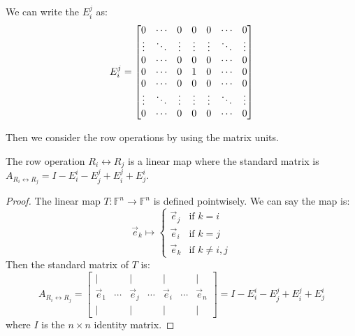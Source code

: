 \documentclass[
	11pt, %
	fleqn, %
	a4paper, %
]{LegrandOrangeBook}
\newcommand{\F}{\mathbb{F}} %
\newcommand{\mypoint}[2]{\tikz[remember picture]{\node[inner sep=0, anchor=base](#1){$#2$};}}
\begin{document}
We can write the $E_i^j$ as:
\vspace{7ex}
\[
    E_i^j = \begin{bmatrix}
        0 & \cdots & 0 & \mypoint{herei}{0} & 0 & \cdots & 0 \\
        \vdots & \ddots & \vdots & \vdots & \vdots & \ddots & \vdots \\
        0 & \cdots & 0 & 0 & 0 & \cdots & 0 \\
        0 & \cdots & 0 & 1 & 0 & \cdots & \mypoint{herej}{0} \\
        0 & \cdots & 0 & 0 & 0 & \cdots & 0 \\
        \vdots & \ddots & \vdots & \vdots & \vdots & \ddots & \vdots \\
        0 & \cdots & 0 & 0 & 0 & \cdots & 0 \\
    \end{bmatrix}
\]

Then we consider the row operations by using the matrix units.

\begin{proposition}
    The row operation $R_i \leftrightarrow R_j$ is a linear map where the standard matrix is $A_{R_i \leftrightarrow R_j} = I - E_i^i - E_j^j + E_i^j + E_j^i$.
\end{proposition}

\begin{proof}
    The linear map $T: \F^n \to \F^n$ is defined pointwisely. We can say the map is:
    \[
        \vec{e}_k \mapsto \begin{cases}
            \vec{e}_j & \text{if } k = i \\
            \vec{e}_i & \text{if } k = j \\
            \vec{e}_k & \text{if } k \neq i, j
        \end{cases}
    \]
    Then the standard matrix of $T$ is:
    \[
        A_{R_i \leftrightarrow R_j} = \begin{bmatrix}
            | & & | & & | & & | \\
            \vec{e}_1 & \cdots & \vec{e}_j & \cdots & \vec{e}_i & \cdots & \vec{e}_n \\
            | & & | & & | & & | 
        \end{bmatrix} = I - E_i^i - E_j^j + E_i^j + E_j^i
    \]
    where $I$ is the $n \times n$ identity matrix.
\end{proof}
\end{document}
